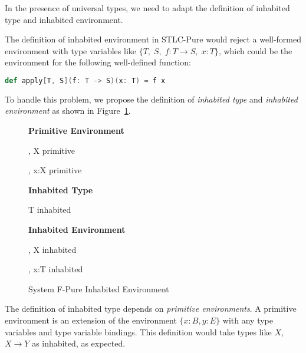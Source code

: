 In the presence of universal types, we need to adapt the definition of
inhabited type and inhabited environment.

The definition of inhabited environment in STLC-Pure would reject a
well-formed environment with type variables like
$\{T, \; S, \; f: T \to S, \; x:T\}$, which could be the environment
for the following well-defined function:

\begin{lstlisting}[language=Scala]
  def apply[T, S](f: T -> S)(x: T) = f x
\end{lstlisting}

To handle this problem, we propose the definition of \emph{inhabited
  type} and \emph{inhabited environment} as shown in
Figure~\ref{fig:f-pure-inhabited}.

\begin{figure}[h]
\begin{framed}

\setlength{\columnseprule}{0.4pt}
\begin{multicols}{2}

\textbf{Primitive Environment}


{ \Sigma ,\; X \quad primitive }

{ \Sigma ,\; x:X \quad primitive }

\textbf{Inhabited Type}

{ T \quad inhabited }

\columnbreak

\textbf{Inhabited Environment}


{ \Gamma ,\; X \quad inhabited }

{ \Gamma ,\; x:T \quad inhabited }

\end{multicols}
\end{framed}

\caption{System F-Pure Inhabited Environment }
\label{fig:f-pure-inhabited}
\end{figure}

The definition of inhabited type depends on \emph{primitive
  environments}. A primitive environment is an extension of the
environment $\{x:B, y:E\}$ with any type variables and type variable
bindings. This definition would take types like $X$, $X \to Y$ as
inhabited, as expected.

